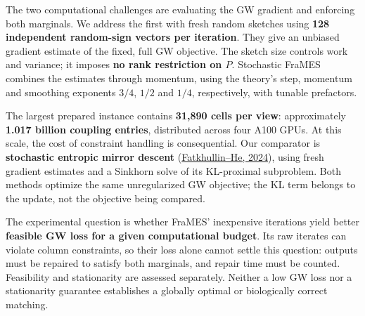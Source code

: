 \documentclass[11pt,a4paper]{article}
\begin{document}
The two computational challenges are evaluating the GW gradient and enforcing both marginals. We address the first with fresh random sketches using \textbf{128 independent random-sign vectors per iteration}. They give an unbiased gradient estimate of the fixed, full GW objective. The sketch size controls work and variance; it imposes \textbf{no rank restriction on $P$}. Stochastic FraMES combines the estimates through momentum, using the theory's step, momentum and smoothing exponents $3/4$, $1/2$ and $1/4$, respectively, with tunable prefactors.

The largest prepared instance contains \textbf{31,890 cells per view}: approximately \textbf{1.017 billion coupling entries}, distributed across four A100 GPUs. At this scale, the cost of constraint handling is consequential. Our comparator is \textbf{stochastic entropic mirror descent} (\href{https://proceedings.mlr.press/v238/fatkhullin24a.html}{Fatkhullin--He, 2024}), using fresh gradient estimates and a Sinkhorn solve of its KL-proximal subproblem. Both methods optimize the same unregularized GW objective; the KL term belongs to the update, not the objective being compared.

The experimental question is whether FraMES' inexpensive iterations yield better \textbf{feasible GW loss for a given computational budget}. Its raw iterates can violate column constraints, so their loss alone cannot settle this question: outputs must be repaired to satisfy both marginals, and repair time must be counted. Feasibility and stationarity are assessed separately. Neither a low GW loss nor a stationarity guarantee establishes a globally optimal or biologically correct matching.
\end{document}
